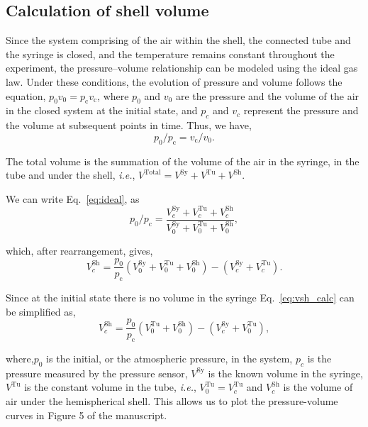 \documentclass[letter,11pt]{article}
\begin{document}
\subsection{Calculation of shell volume}
Since the system comprising of the air within the shell, the connected tube and the syringe is closed, and the temperature remains constant throughout the experiment, the pressure–volume relationship can be modeled using the ideal gas law. Under these conditions, the evolution of pressure and volume follows the equation, $p_\mathrm{0}  v_\mathrm{0}=p_\mathrm{c} v_\mathrm{c}$, where \( p_0 \) and \( v_0 \) are the pressure and the volume of the air in the closed system at the initial state, and \( p_c \) and \( v_c \) represent the pressure and the volume at subsequent points in time. Thus, we have,
\begin{equation}
p_\mathrm{0} / p_\mathrm{c}=v_\mathrm{c} / v_\mathrm{0}.\label{eq:ideal}
\end{equation}
    
The total volume is the summation of the volume of the air in the syringe, in the tube and under the shell, \textit{i.e.}, $V^{\mathrm{Total}}=V^{\mathrm{Sy}}+V^{\mathrm{Tu}}+ V^{\mathrm{Sh}}$.

We can write Eq.~\ref{eq:ideal}, as 
 \begin{equation}
    p_\mathrm{0} / p_\mathrm{c}=\frac{V^{\mathrm{Sy}}_c+V^{\mathrm{Tu}}_c+V^{\mathrm{Sh}}_c}{V^{\mathrm{Sy}}_0+V^{\mathrm{Tu}}_0+V^{\mathrm{Sh}}_0},
\end{equation}

which, after rearrangement, gives,
  \begin{equation}
    V^{\mathrm{Sh}}_c = \frac{p_\mathrm{0}}{ p_\mathrm{c}}(V^{\mathrm{Sy}}_0+V^{\mathrm{Tu}}_0+V^{\mathrm{Sh}}_0)-(V^{\mathrm{Sy}}_c+V^{\mathrm{Tu}}_c).
    \label{eq:vsh_calc}
\end{equation}

Since at the initial state there is no volume in the syringe Eq.~\ref{eq:vsh_calc} can be simplified as,
\begin{equation}
    V^{\mathrm{Sh}}_c = \frac{p_\mathrm{0}}{p_\mathrm{c}}(V^{\mathrm{Tu}}_0+V^{\mathrm{Sh}}_0)-(V^{\mathrm{Sy}}_c+V^{\mathrm{Tu}}_0),
\end{equation}

where,$p_0$ is the initial, or the atmospheric pressure, in the system, $p_c$ is the pressure measured by the pressure sensor, $V^{\mathrm{Sy}}$ is the known volume in the syringe, $V^{\mathrm{Tu}}$ is the constant volume in the tube, \textit{i.e.}, $ V^{\mathrm{Tu}}_0=V^{\mathrm{Tu}}_c$ and $V^{\mathrm{Sh}}_c$ is the volume of air under the hemispherical shell. This allows us to plot the pressure-volume curves in Figure 5 of the manuscript.
\end{document}
